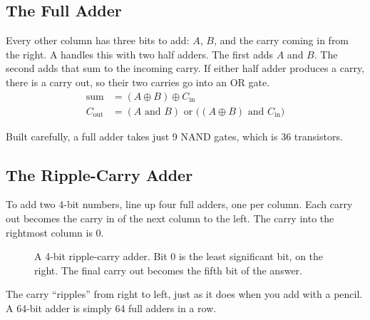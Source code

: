 \subsection{The Full Adder}
Every other column has three bits to add: $A$, $B$, and the carry coming in from the right. A
 handles this with two half adders. The first adds $A$ and $B$. The second adds that
sum to the incoming carry. If either half adder produces a carry, there is a carry out, so their two
carries go into an OR gate.
\begin{align*}
\text{sum} &= (A \oplus B) \oplus C_{\text{in}} \\
C_{\text{out}} &= (A \text{ and } B) \text{ or } \big((A \oplus B) \text{ and } C_{\text{in}}\big)
\end{align*}

Built carefully, a full adder takes just 9 NAND gates, which is 36 transistors.

\subsection{The Ripple-Carry Adder}
To add two 4-bit numbers, line up four full adders, one per column. Each carry out becomes the carry in
of the next column to the left. The carry into the rightmost column is 0.

\begin{figure}[htbp]
\centering
{}
\caption{A 4-bit ripple-carry adder. Bit 0 is the least significant bit, on the right. The final
carry out becomes the fifth bit of the answer.}
\label{fig:ripple}
\end{figure}

The carry ``ripples'' from right to left, just as it does when you add with a pencil. A 64-bit adder
is simply 64 full adders in a row.

